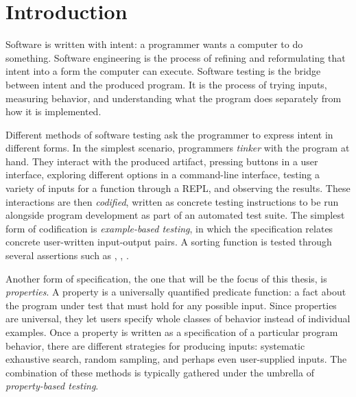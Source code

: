 
\renewcommand{\thechapter}{1}

\chapter{Introduction}\label{chap:intro}

Software is written with intent: a programmer wants a computer to do something.
Software engineering is the process of refining and reformulating that intent into a
form the computer can execute. Software testing is the bridge between intent and the
produced program. It is the process of trying inputs, measuring behavior, and
understanding what the program does separately from how it is implemented.


Different methods of software testing ask the programmer to express intent in different
forms. In the simplest scenario, programmers \emph{tinker} with the program at hand.
They interact with the produced artifact, pressing buttons in a user interface,
exploring different options in a command-line interface, testing a variety of inputs
for a function through a REPL, and observing the results. These interactions are then
\emph{codified}, written as concrete testing instructions to be run alongside program
development as part of an automated test suite. The simplest form of codification is
\emph{example-based testing}, in which the specification relates concrete user-written
input-output pairs. A sorting function is tested through several assertions such as
, , .

Another form of specification, the one that will be the focus of this thesis, is
\emph{properties}. A property is a universally quantified predicate function: a fact
about the program under test that must hold for any possible input. Since properties
are universal, they let users specify whole classes of behavior instead of individual
examples. Once a property is written as a specification of a particular program
behavior, there are different strategies for producing inputs: systematic exhaustive
search, random sampling, and perhaps even user-supplied inputs. The combination of
these methods is typically gathered under the umbrella of \emph{property-based
    testing}.

